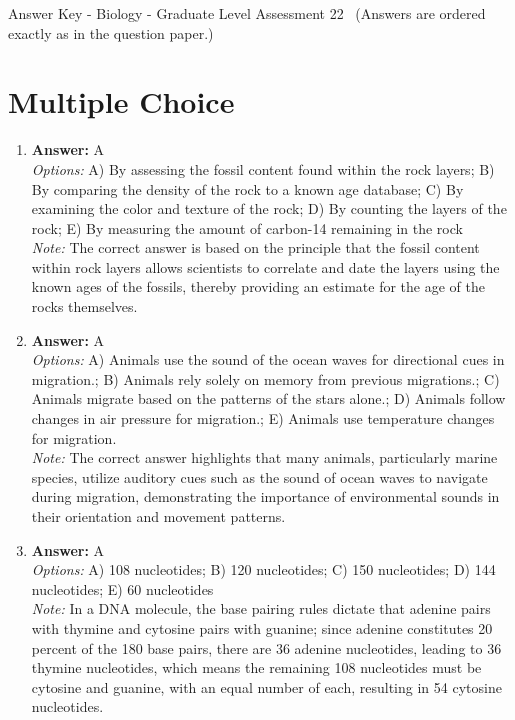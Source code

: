 \documentclass[12pt]{article}
\begin{document}
\begin{center}
Answer Key - Biology - Graduate Level Assessment 22 \
\small (Answers are ordered exactly as in the question paper.)
\end{center}

\section*{Multiple Choice}
\begin{enumerate}[label=\arabic*.]
\item \textbf{Answer:} A
\\ \textit{Options:} A) By assessing the fossil content found within the rock layers; B) By comparing the density of the rock to a known age database; C) By examining the color and texture of the rock; D) By counting the layers of the rock; E) By measuring the amount of carbon-14 remaining in the rock
\\ \textit{Note:} The correct answer is based on the principle that the fossil content within rock layers allows scientists to correlate and date the layers using the known ages of the fossils, thereby providing an estimate for the age of the rocks themselves.
\item \textbf{Answer:} A
\\ \textit{Options:} A) Animals use the sound of the ocean waves for directional cues in migration.; B) Animals rely solely on memory from previous migrations.; C) Animals migrate based on the patterns of the stars alone.; D) Animals follow changes in air pressure for migration.; E) Animals use temperature changes for migration.
\\ \textit{Note:} The correct answer highlights that many animals, particularly marine species, utilize auditory cues such as the sound of ocean waves to navigate during migration, demonstrating the importance of environmental sounds in their orientation and movement patterns.
\item \textbf{Answer:} A
\\ \textit{Options:} A) 108 nucleotides; B) 120 nucleotides; C) 150 nucleotides; D) 144 nucleotides; E) 60 nucleotides
\\ \textit{Note:} In a DNA molecule, the base pairing rules dictate that adenine pairs with thymine and cytosine pairs with guanine; since adenine constitutes 20 percent of the 180 base pairs, there are 36 adenine nucleotides, leading to 36 thymine nucleotides, which means the remaining 108 nucleotides must be cytosine and guanine, with an equal number of each, resulting in 54 cytosine nucleotides.

\end{enumerate}
\end{document}
